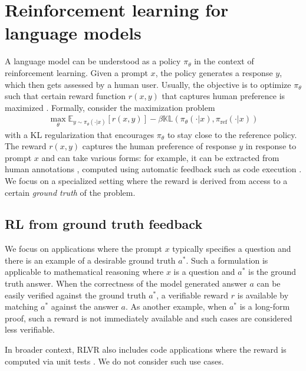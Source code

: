 \documentclass{article}
\theoremstyle{definition}
\begin{document}
\section{Reinforcement learning for language models}

A language model can be understood as a policy $\pi_\theta$ in the context of reinforcement learning. Given a prompt $x$, the policy generates a response $y$, which then gets assessed by a human user. Usually, the objective is to optimize $\pi_\theta$ such that certain reward function $r(x,y)$ that captures human preference is maximized \citep{christiano2017deep,ouyang2022training}. Formally, consider the maximization problem
\begin{align}
    \max_\theta \mathbb{E}_{y\sim \pi_\theta(\cdot|x)}\left[r(x,y)\right] -\beta \mathbb{KL}\left(\pi_\theta(\cdot|x),\pi_\text{ref}(\cdot|x)\right) \label{eq:rlhf}
\end{align}
with a KL regularization that encourages $\pi_\theta$ to stay close to the reference policy. The reward $r(x,y)$ captures the human preference of response $y$ in response to prompt $x$ and can take various forms: for example, it can be extracted from human annotations \citep{christiano2017deep,ziegler2019fine,ouyang2022training}, computed using automatic feedback such as code execution \citep{gehring2024rlef,wei2025swe}. We focus on a specialized setting where the reward is derived from access to a certain \emph{ground truth} of the problem.

\subsection{RL from ground truth feedback}

We focus on applications where the prompt $x$ typically specifies a question and there is an example of a desirable ground truth $a^\ast$. Such a formulation is applicable to mathematical reasoning \citep{hendrycks2021measuring,uesato2022solving,lightman2023let} where $x$ is a question and $a^\ast$ is the ground truth answer. When the correctness of the model generated answer $a$ can be easily verified against the ground truth $a^*$, a verifiable reward $r$ is available by matching $a^\ast$ against the answer $a$. As another example, when $a^*$ is a long-form proof, such a reward is not immediately available and such cases are considered less verifiable.

In broader context, RLVR also includes code applications where the reward is computed via unit tests \citep{gehring2024rlef,wei2025swe}. We do not consider such use cases.
\end{document}
